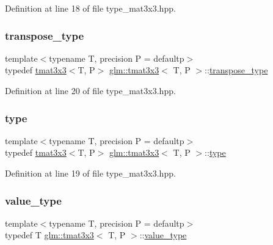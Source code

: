 Definition at line 18 of file type\+\_\+mat3x3.\+hpp.

\mbox{\label{structglm_1_1tmat3x3_ac27e769fb5ed861068079f433a1d5b8f}} 
\subsubsection{\texorpdfstring{transpose\_type}{transpose\_type}}
{\footnotesize\ttfamily template$<$typename T, precision P = defaultp$>$ \\
typedef \mbox{\hyperlink{structglm_1_1tmat3x3}{tmat3x3}}$<$T, P$>$ \mbox{\hyperlink{structglm_1_1tmat3x3}{glm\+::tmat3x3}}$<$ T, P $>$\+::\mbox{\hyperlink{structglm_1_1tmat3x3_ac27e769fb5ed861068079f433a1d5b8f}{transpose\+\_\+type}}}



Definition at line 20 of file type\+\_\+mat3x3.\+hpp.

\mbox{\label{structglm_1_1tmat3x3_a0c427c28a6ca62343de768023cd69bf4}} 
\subsubsection{\texorpdfstring{type}{type}}
{\footnotesize\ttfamily template$<$typename T, precision P = defaultp$>$ \\
typedef \mbox{\hyperlink{structglm_1_1tmat3x3}{tmat3x3}}$<$T, P$>$ \mbox{\hyperlink{structglm_1_1tmat3x3}{glm\+::tmat3x3}}$<$ T, P $>$\+::\mbox{\hyperlink{structglm_1_1tmat3x3_a0c427c28a6ca62343de768023cd69bf4}{type}}}



Definition at line 19 of file type\+\_\+mat3x3.\+hpp.

\mbox{\label{structglm_1_1tmat3x3_a90013767ff8a88d1ec5dd54574579669}} 
\subsubsection{\texorpdfstring{value\_type}{value\_type}}
{\footnotesize\ttfamily template$<$typename T, precision P = defaultp$>$ \\
typedef T \mbox{\hyperlink{structglm_1_1tmat3x3}{glm\+::tmat3x3}}$<$ T, P $>$\+::\mbox{\hyperlink{structglm_1_1tmat3x3_a90013767ff8a88d1ec5dd54574579669}{value\+\_\+type}}}



